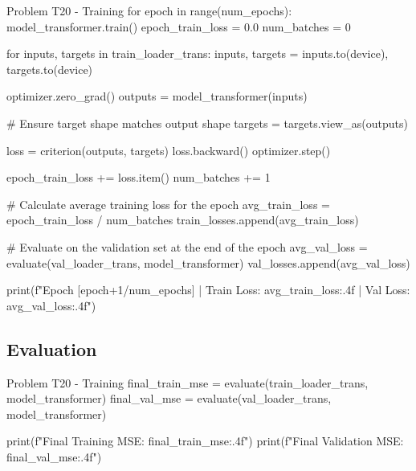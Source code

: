 \documentclass[12pt, a4paper]{article}
\begin{document}
                \begin{codeblock}{Problem T20 - Training}
                    for epoch in range(num_epochs):
                        model_transformer.train()
                        epoch_train_loss = 0.0
                        num_batches = 0
                        
                        for inputs, targets in train_loader_trans:
                            inputs, targets = inputs.to(device), targets.to(device)
                            
                            optimizer.zero_grad()
                            outputs = model_transformer(inputs)
                            
                            # Ensure target shape matches output shape
                            targets = targets.view_as(outputs)
                            
                            loss = criterion(outputs, targets)
                            loss.backward()
                            optimizer.step()
                            
                            epoch_train_loss += loss.item()
                            num_batches += 1
                            
                        # Calculate average training loss for the epoch
                        avg_train_loss = epoch_train_loss / num_batches
                        train_losses.append(avg_train_loss)
                        
                        # Evaluate on the validation set at the end of the epoch
                        avg_val_loss = evaluate(val_loader_trans, model_transformer)
                        val_losses.append(avg_val_loss)
                        
                        print(f"Epoch [{epoch+1}/{num_epochs}] | Train Loss: {avg_train_loss:.4f} | Val Loss: {avg_val_loss:.4f}")
                \end{codeblock}

        \subsection{Evaluation}
            \begin{codeblock}{Problem T20 - Training}
                final_train_mse = evaluate(train_loader_trans, model_transformer)
                final_val_mse = evaluate(val_loader_trans, model_transformer)

                print(f"Final Training MSE: {final_train_mse:.4f}")
                print(f"Final Validation MSE: {final_val_mse:.4f}")
            \end{codeblock}
\end{document}
